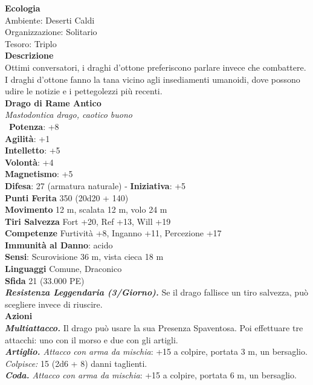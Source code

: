 \begin{multicols}{2}
\textbf{Ecologia}\\
Ambiente: Deserti Caldi\\
Organizzazione: Solitario\\
Tesoro: Triplo\\
\textbf{Descrizione}\\
Ottimi conversatori, i draghi d’ottone preferiscono parlare invece che combattere. I draghi d’ottone fanno la tana vicino agli insediamenti umanoidi, dove possono udire le notizie e i pettegolezzi più recenti.\\


\medskip\textbf{Drago di Rame Antico}\\
\emph{Mastodontica drago, caotico buono}\\\
\textbf{Potenza}: +8\\
\textbf{Agilità}: +1\\
\textbf{Intelletto}: +5\\
\textbf{Volontà}: +4\\
\textbf{Magnetismo}: +5\\
\textbf{Difesa}: 27 (armatura naturale) - \textbf{Iniziativa}: +5\\
\textbf{Punti Ferita} 350 (20d20 + 140)\\
\textbf{Movimento} 12 m, scalata 12 m, volo 24 m\\
\textbf{Tiri Salvezza} Fort +20, Ref +13, Will +19\\
\textbf{Competenze} Furtività +8, Inganno +11, Percezione +17\\
\textbf{Immunità al Danno}: acido\\
\textbf{Sensi}: Scurovisione 36 m, vista cieca 18 m\\
\textbf{Linguaggi} Comune, Draconico\\
\textbf{Sfida} 21 (33.000 PE)\smallskip\\
\emph{\textbf{Resistenza Leggendaria (3/Giorno).}} Se il drago fallisce un tiro salvezza, può scegliere invece di riuscire.\\
\smallskip\textbf{Azioni}\\
\emph{\textbf{Multiattacco.}} Il drago può usare la sua Presenza Spaventosa. Poi effettuare tre attacchi: uno con il morso e due con gli artigli.\\
\emph{\textbf{Artiglio.} Attacco con arma da mischia}: +15 a colpire, portata 3 m, un bersaglio.\\
\emph{Colpisce:} 15 (2d6 + 8) danni taglienti.\\
\emph{\textbf{Coda.} Attacco con arma da mischia}: +15 a colpire, portata 6 m, un bersaglio.\\

\end{multicols}
